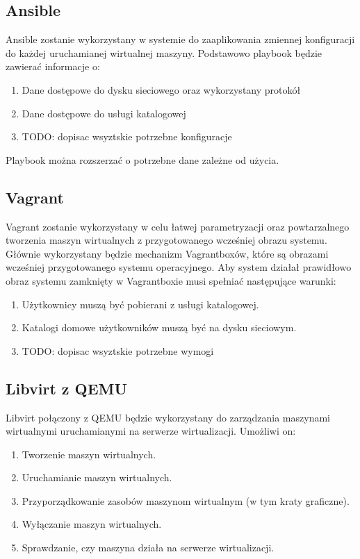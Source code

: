 \documentclass[../../deliverable-two.tex]{subfiles}
\begin{document}
\label{external-tools}

\subsection{Ansible}
Ansible zostanie wykorzystany w systemie do zaaplikowania zmiennej konfiguracji do każdej uruchamianej wirtualnej maszyny.
Podstawowo playbook będzie zawierać informacje o:
\begin{enumerate}
	\item Dane dostępowe do dysku sieciowego oraz wykorzystany protokół
	\item Dane dostępowe do usługi katalogowej
	\item TODO: dopisac wsyztskie potrzebne konfiguracje
\end{enumerate}
Playbook można rozszerzać o potrzebne dane zależne od użycia.

\subsection{Vagrant}
Vagrant zostanie wykorzystany w celu łatwej parametryzacji oraz powtarzalnego tworzenia maszyn wirtualnych z przygotowanego wcześniej obrazu systemu.
Głównie wykorzystany będzie mechanizm Vagrantboxów, które są obrazami wcześniej przygotowanego systemu operacyjnego.
Aby system działał prawidłowo obraz systemu zamknięty w Vagrantboxie musi spełniać następujące warunki:
\begin{enumerate}
	\item Użytkownicy muszą być pobierani z usługi katalogowej.
	\item Katalogi domowe użytkowników muszą być na dysku sieciowym.
	\item TODO: dopisac wsyztskie potrzebne wymogi
\end{enumerate}

\subsection{Libvirt z QEMU}
Libvirt połączony z QEMU będzie wykorzystany do zarządzania maszynami wirtualnymi uruchamianymi na serwerze wirtualizacji.
Umożliwi on:
\begin{enumerate}
	\item Tworzenie maszyn wirtualnych.
	\item Uruchamianie maszyn wirtualnych.
	\item Przyporządkowanie zasobów maszynom wirtualnym (w tym kraty graficzne).
	\item Wyłączanie maszyn wirtualnych.
	\item Sprawdzanie, czy maszyna działa na serwerze wirtualizacji.
\end{enumerate}
\end{document}
